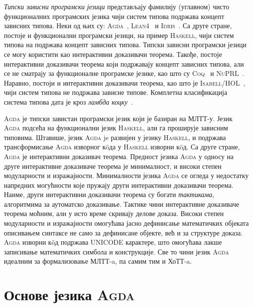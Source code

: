 \documentclass[12pt,oneside]{memoir}
\begin{document}
\emph{Типски зависни програмски језици} представљају фамилију (углавном) чисто функционалних програмских језика чији систем типова подржава концепт зависних типова. Неки од њих су: \textsc{Agda}~\cite{norell07, norell09}, \textsc{Lean4}~\cite{lean4} и \textsc{Idris}~\cite{bra13}.  Са друге стране, постоје и функционални програмски језици,  на пример \textsc{Haskell}, чији систем типова на подржава концепт зависних типова. Типски зависни програмски језици се могу користити као интерактивни доказивачи
теорема. Такође, постоје интерактивни доказивачи теорема који подржавају концепт зависних типова, али се не сматрају за функционалне програмске језике, као што су \textsc{Coq}~\cite{coq} и \textsc{NuPRL}~\cite{nuprl86}. Наравно, постоји и интерактивни доказивачи теорема, као што је \textsc{Isabell/HOL}~\cite{isabelle_hol}, чији систем типова не подржава зависне типове. Комплетна класификација система типова дата је кроз \emph{ламбда коцку}~\cite{lambda_cube}.

\textsc{Agda} је типски завистан програмски језик који је базиран на МЛТТ-у. Језик \textsc{Agda} подсећа на функционални језик \textsc{Haskell}, али га проширује зависним типовима. Штавише, језик \textsc{Agda} je развијен у језику \textsc{Haskell}, и подржава трансформисање \textsc{Agda} изворног к{\"o}да у \textsc{Haskell} изворни к{\"o}д. Са друге стране, \textsc{Agda} је интерактивни доказивач теорема. Предност језика \textsc{Agda} у односу на друге интерактивне доказиваче теорема је минималност, и високи степен модуларности и изражајности. Минималности језика \textsc{Agda} се огледа у недостатку напредних могућности које пружају други интерактивни доказивачи теорема. Наиме, други интерактивни доказивачи теорема су богати \emph{тактикама}, алгоритмима за аутоматско доказивање. Тактике чини интерактивне доказиваче теорема моћним, али у исто време скривају делове доказа. Високи степен модуларности и изражајности омогућава јасно дефинисање математичких објеката описивањем синтаксе не само за дефинисане објекте, већ и за структуре доказа. \textsc{Agda} изворни к{\"o}д подржава \textsc{UNICODE} карактере, што омогућава лакше записивање математичких симбола и конструкције. Све то чини језик \textsc{Agda} идеалним за формализовање МЛТТ-a, па самим тим и ХоТТ-a.  

\section{Основе језика \textsc{Agda}}
\end{document}
